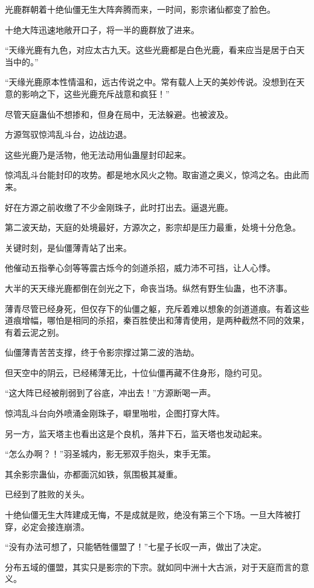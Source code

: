 \begin{this_body}
光鹿群朝着十绝仙僵无生大阵奔腾而来，一时间，影宗诸仙都变了脸色。

十绝大阵迅速地敞开口子，将一半的鹿群放了进来。

“天缘光鹿有九色，对应太古九天。这些光鹿都是白色光鹿，看来应当是居于白天当中的。”

“天缘光鹿原本性情温和，远古传说之中。常有载人上天的美妙传说。没想到在天意的影响之下，这些光鹿充斥战意和疯狂！”

尽管天庭蛊仙不想掺和，但身在局中，无法躲避。也被波及。

方源驾驭惊鸿乱斗台，边战边退。

这些光鹿乃是活物，他无法动用仙蛊屋封印起来。

惊鸿乱斗台能封印的攻势。都是地水风火之物。取宙道之奥义，惊鸿之名。由此而来。

好在方源之前收缴了不少金刚珠子，此时打出去。逼退光鹿。

第二波天劫，天庭的处境最好，方源次之，影宗却是压力最重，处境十分危急。

关键时刻，是仙僵薄青站了出来。

他催动五指拳心剑等等震古烁今的剑道杀招，威力沛不可挡，让人心悸。

大半的天天缘光鹿都倒在剑光之下，命丧当场。纵然有野生仙蛊，也不济事。

薄青尽管已经身死，但仅存下的仙僵之躯，充斥着难以想象的剑道道痕。有着这些道痕增幅，哪怕是相同的杀招，秦百胜使出和薄青使用，是两种截然不同的效果，有着云泥之别。

仙僵薄青苦苦支撑，终于令影宗撑过第二波的浩劫。

但天空中的阴云，已经稀薄无比，十位仙僵再藏不住身形，隐约可见。

“这大阵已经被削弱到了谷底，冲出去！”方源断喝一声。

惊鸿乱斗台向外喷涌金刚珠子，噼里啪啦，企图打穿大阵。

另一方，监天塔主也看出这是个良机，落井下石，监天塔也发动起来。

“怎么办啊？！”羽圣城内，影无邪双手抱头，束手无策。

其余影宗蛊仙，亦都面沉如铁，氛围极其凝重。

已经到了胜败的关头。

十绝仙僵无生大阵建成无悔，不是成就是败，绝没有第三个下场。一旦大阵被打穿，必定会接连崩溃。

“没有办法可想了，只能牺牲僵盟了！”七星子长叹一声，做出了决定。

分布五域的僵盟，其实只是影宗的下宗。就如同中洲十大古派，对于天庭而言的意义。


\end{this_body}
